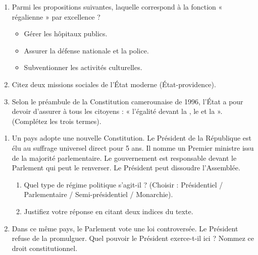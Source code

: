 \documentclass[11pt]{article}
\begin{document}
\begin{exercice}
\begin{enumerate}
    \item Parmi les propositions suivantes, laquelle correspond à la fonction « régalienne » par excellence ?
    \begin{itemize}
        \item Gérer les hôpitaux publics.
        \item Assurer la défense nationale et la police.
        \item Subventionner les activités culturelles.
    \end{itemize}
    \item Citez deux missions sociales de l'État moderne (État-providence).
    \item Selon le préambule de la Constitution camerounaise de 1996, l'État a pour devoir d'assurer à tous les citoyens : « l'égalité devant la \underline{\hspace{3cm}}, le \underline{\hspace{3cm}} et la \underline{\hspace{3cm}} ». (Complétez les trois termes).
\end{enumerate}
\end{exercice}

\begin{exercice}
\begin{enumerate}
    \item Un pays adopte une nouvelle Constitution. Le Président de la République est élu au suffrage universel direct pour 5 ans. Il nomme un Premier ministre issu de la majorité parlementaire. Le gouvernement est responsable devant le Parlement qui peut le renverser. Le Président peut dissoudre l'Assemblée.
    \begin{enumerate}
        \item Quel type de régime politique s'agit-il ? (Choisir : Présidentiel / Parlementaire / Semi-présidentiel / Monarchie).
        \item Justifiez votre réponse en citant deux indices du texte.
    \end{enumerate}
    \item Dans ce même pays, le Parlement vote une loi controversée. Le Président refuse de la promulguer. Quel pouvoir le Président exerce-t-il ici ? Nommez ce droit constitutionnel.
\end{enumerate}
\end{exercice}
\end{document}

